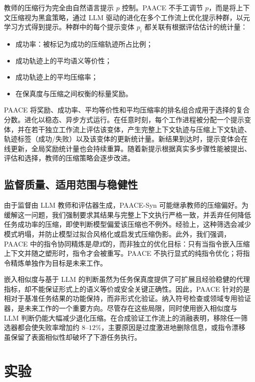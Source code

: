 \documentclass[10pt,twocolumn]{article}
\begin{document}
教师的压缩行为完全由自然语言提示 $p$ 控制。PAACE 不手工调节 $p$，而是将上下文压缩视为黑盒策略，通过 LLM 驱动的进化在多个工作流上优化提示种群，以元学习方式得到提示。种群中的每个提示变体 $p_i$ 都关联有根据评估估计的统计量：
\begin{itemize}
  \item 成功率：被标记为成功的压缩轨迹所占比例；
  \item 成功轨迹上的平均语义等价性；
  \item 成功轨迹上的平均压缩率；
  \item 在保真度与压缩之间权衡的标量奖励。
\end{itemize}

PAACE 将奖励、成功率、平均等价性和平均压缩率的排名组合成用于选择的复合分数。进化以稳态、异步方式运行。在任意时刻，每个工作进程被分配一个提示变体，并在若干独立工作流上评估该变体，产生完整上下文轨迹与压缩上下文轨迹、轨迹标签（成功/失败）以及该变体的更新统计量。新结果到达时，提示变体会在线更新，全局奖励统计量也会持续重算。随着新提示根据真实多步骤性能被提出、评估和选择，教师的压缩策略会逐步改进。

\subsection{监督质量、适用范围与稳健性}

由于监督由 LLM 教师和评估器生成，PAACE-Syn 可能继承教师的压缩偏好。为缓解这一问题，我们强制要求其结果与完整上下文执行严格一致，并丢弃任何降低任务成功率的压缩，即使判断模型偏爱该压缩也不例外。经验上，这种筛选会减少模式坍塌，并防止模型过拟合风格化或启发式压缩伪影。此外，我们强调，PAACE 中的指令协同精炼是\emph{隐式}的，而非独立的优化目标：只有当指令嵌入压缩上下文并随之塑形时，指令才会被重写。PAACE 不执行显式的纯指令优化；将指令精炼单独作为目标是未来工作。

嵌入相似度与基于 LLM 的判断虽然为任务保真度提供了可扩展且经验稳健的代理指标，却不能保证形式上的语义等价或安全关键正确性。因此，PAACE 针对的是相对于基准任务结果的功能保持，而非形式化验证。纳入符号检查或领域专用验证器，是未来工作的一个重要方向。尽管存在这些局限，同时使用嵌入相似度与 LLM 判断仍能大幅减少退化压缩。在合成验证工作流上的消融表明，移除任一筛选器都会使失败率增加约 $8$--$12\%$，主要原因是过度激进地删除信息，或指令漂移虽保留了表面相似性却破坏了下游任务执行。

\section{实验}
\label{sec:experiments}
\end{document}
